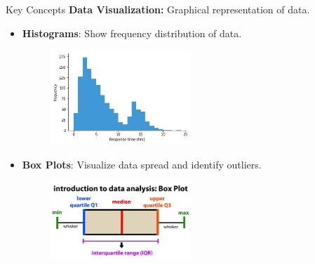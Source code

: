 \documentclass{beamer}
\begin{document}
\begin{frame}{Key Concepts}
\textbf{Data Visualization:} Graphical representation of data.
\begin{itemize}
    \item \textbf{Histograms}: Show frequency distribution of data.
        \begin{figure}
            \centering
            \includegraphics[width=0.5\textwidth]{histogram.png}
        \end{figure}
    \item \textbf{Box Plots}: Visualize data spread and identify outliers.
        \begin{figure}
            \centering
            \includegraphics[width=0.5\textwidth]{box-plot.png}
        \end{figure}
    \end{itemize}
\end{frame}
\end{document}
